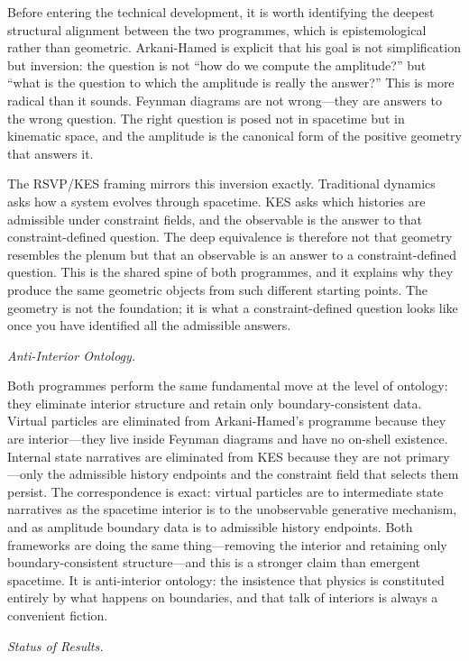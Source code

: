 \documentclass[11pt]{article}
\theoremstyle{plain}
\theoremstyle{definition}
\theoremstyle{remark}
\begin{document}
Before entering the technical development, it is worth identifying the deepest structural alignment between the two programmes, which is epistemological rather than geometric. Arkani-Hamed is explicit that his goal is not simplification but inversion: the question is not ``how do we compute the amplitude?'' but ``what is the question to which the amplitude is really the answer?'' This is more radical than it sounds. Feynman diagrams are not wrong---they are answers to the wrong question. The right question is posed not in spacetime but in kinematic space, and the amplitude is the canonical form of the positive geometry that answers it.

The RSVP/KES framing mirrors this inversion exactly. Traditional dynamics asks how a system evolves through spacetime. KES asks which histories are admissible under constraint fields, and the observable is the answer to that constraint-defined question. The deep equivalence is therefore not that geometry resembles the plenum but that an observable is an answer to a constraint-defined question. This is the shared spine of both programmes, and it explains why they produce the same geometric objects from such different starting points. The geometry is not the foundation; it is what a constraint-defined question looks like once you have identified all the admissible answers.

\medskip\noindent\textit{Anti-Interior Ontology.}

Both programmes perform the same fundamental move at the level of ontology: they eliminate interior structure and retain only boundary-consistent data. Virtual particles are eliminated from Arkani-Hamed's programme because they are interior---they live inside Feynman diagrams and have no on-shell existence. Internal state narratives are eliminated from KES because they are not primary---only the admissible history endpoints and the constraint field that selects them persist. The correspondence is exact: virtual particles are to intermediate state narratives as the spacetime interior is to the unobservable generative mechanism, and as amplitude boundary data is to admissible history endpoints. Both frameworks are doing the same thing---removing the interior and retaining only boundary-consistent structure---and this is a stronger claim than emergent spacetime. It is anti-interior ontology: the insistence that physics is constituted entirely by what happens on boundaries, and that talk of interiors is always a convenient fiction.

\medskip\noindent\textit{Status of Results.}
\end{document}
